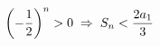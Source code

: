 \documentclass[preview]{standalone}
\begin{document}
\begin{align*}
\special{dvisvgm:raw <g id='unique000'>}\left(-\frac{1}{2}\right)^n>0 \;\Rightarrow\; S_n<\frac{2a_1}{3}\special{dvisvgm:raw </g>}
\end{align*}
\end{document}

